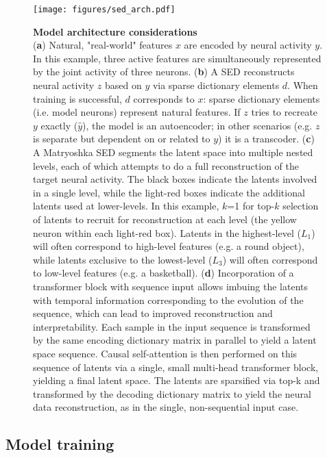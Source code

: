 \begin{figure}[tbph]
    \texttt{[image: figures/sed\_arch.pdf]}
    \caption{
        \textbf{Model architecture considerations} \\
        \small
        (\textbf{a}) Natural, "real-world" features $x$ are encoded by neural activity $y$. In this example, three active features are simultaneously represented by the joint activity of three neurons. (\textbf{b}) A SED reconstructs neural activity $z$ based on $y$ via sparse dictionary elements $d$. When training is successful, $d$ corresponds to $x$: sparse dictionary elements (i.e. model neurons) represent natural features. If $z$ tries to recreate $y$ exactly ($\hat{y}$), the model is an autoencoder; in other scenarios (e.g. $z$ is separate but dependent on or related to $y$) it is a transcoder. (\textbf{c}) A Matryoshka SED segments the latent space into multiple nested levels, each of which attempts to do a full reconstruction of the target neural activity. The black boxes indicate the latents involved in a single level, while the light-red boxes indicate the additional latents used at lower-levels. In this example, $k$=1 for top-$k$ selection of latents to recruit for reconstruction at each level (the yellow neuron within each light-red box). Latents in the highest-level ($L_1$) will often correspond to high-level features (e.g. a round object), while latents exclusive to the lowest-level ($L_3$) will often correspond to low-level features (e.g. a basketball). (\textbf{d}) Incorporation of a transformer block with sequence input allows imbuing the latents with temporal information corresponding to the evolution of the sequence, which can lead to improved reconstruction and interpretability. Each sample in the input sequence is transformed by the same encoding dictionary matrix in parallel to yield a latent space sequence. Causal self-attention is then performed on this sequence of latents via a single, small multi-head transformer block, yielding a final latent space. The latents are sparsified via top-k and transformed by the decoding dictionary matrix to yield the neural data reconstruction, as in the single, non-sequential input case.
        \vspace{-1em}
    }
    \label{figure:sed_arch}
\end{figure}

\subsection{Model training}


